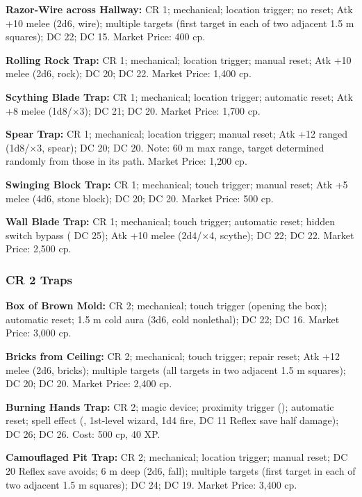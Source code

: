 \textbf{Razor-Wire across Hallway:} CR 1; mechanical; location trigger; no reset; Atk +10 melee (2d6, wire); multiple targets (first target in each of two adjacent 1.5 m squares);  DC 22;  DC 15. Market Price: 400 cp.

\textbf{Rolling Rock Trap:} CR 1; mechanical; location trigger; manual reset; Atk +10 melee (2d6, rock);  DC 20;  DC 22. Market Price: 1,400 cp.

\textbf{Scything Blade Trap:} CR 1; mechanical; location trigger; automatic reset; Atk +8 melee (1d8/$\times$3);  DC 21;  DC 20. Market Price: 1,700 cp.

\textbf{Spear Trap:} CR 1; mechanical; location trigger; manual reset; Atk +12 ranged (1d8/$\times$3, spear);  DC 20;  DC 20. Note: 60 m max range, target determined randomly from those in its path. Market Price: 1,200 cp.

\textbf{Swinging Block Trap:} CR 1; mechanical; touch trigger; manual reset; Atk +5 melee (4d6, stone block);  DC 20;  DC 20. Market Price: 500 cp.

\textbf{Wall Blade Trap:} CR 1; mechanical; touch trigger; automatic reset; hidden switch bypass ( DC 25); Atk +10 melee (2d4/$\times$4, scythe);  DC 22;  DC 22. Market Price: 2,500 cp.

\subsubsection{CR 2 Traps}
\textbf{Box of Brown Mold:} CR 2; mechanical; touch trigger (opening the box); automatic reset; 1.5 m cold aura (3d6, cold nonlethal);  DC 22;  DC 16. Market Price: 3,000 cp.

\textbf{Bricks from Ceiling:} CR 2; mechanical; touch trigger; repair reset; Atk +12 melee (2d6, bricks); multiple targets (all targets in two adjacent 1.5 m squares);  DC 20;  DC 20. Market Price: 2,400 cp.

\textbf{Burning Hands Trap:} CR 2; magic device; proximity trigger (); automatic reset; spell effect (, 1st-level wizard, 1d4 fire, DC 11 Reflex save half damage);  DC 26;  DC 26. Cost: 500 cp, 40 XP.

\textbf{Camouflaged Pit Trap:} CR 2; mechanical; location trigger; manual reset; DC 20 Reflex save avoids; 6 m deep (2d6, fall); multiple targets (first target in each of two adjacent 1.5 m squares);  DC 24;  DC 19. Market Price: 3,400 cp.

